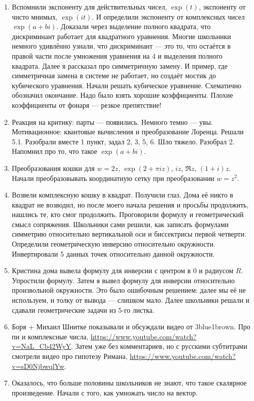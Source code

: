 \documentclass[12pt]{article}
\theoremstyle{definition}
\begin{document}
\begin{enumerate}
  \item Вспомнили экспоненту для действительных чисел, $\exp(t)$, экспоненту от чисто мнимых, $\exp(it)$. 
  И определили экспоненту от комплексных чисел $\exp(a + bi)$. Доказали через выделение полного квадрата, что дискриминант работает 
  для квадратного уравнения. Многие школьники немного удивлённо узнали, 
  что дискриминант — это то, что остаётся в правой части после умножения уравнения на 4 и выделения полного квадрата. 
  Далее я рассказал про симметричную замену. И пример, где симметричная замена в системе не работает, но создаёт мостик до кубического уравнения. 
  Начали решать кубическое уравнение. Схематично обозначил окончание. Надо было взять хорошие коэффициенты. Плохие коэффициенты от фонаря — резкое препятствие!
  \item   Реакция на критику: парты — появились. Немного темно — увы. Мотивационное: квантовые вычисления и преобразование Лоренца. 
  Решали 5.1. Разобрали вместе 1 пункт, задал 2, 3, 5, 6. Шло тяжело. Разобрал 2. Напомнил про то, что такое $\exp(a + bi)$.
  \item Преобразования кошки для $w=2z$, $\exp(2+\pi i z)$, $iz$, $\Re z$, $(1+i) z$. Начали преобразовывать координатную сетку при преобразовании $w=z^2$.
  \item Возвели комплексную кошку в квадрат. Получили глаз. Дома её никто в квадрат не возводил, но после моего начала решения и просьбы продолжить,
  нашлись те, кто смог продолжить. Проговорили формулу и геометрический смысл сопряжения. Школьники сами решили, как записать 
  формулами симметрию относительно вертикальной оси и биссектрисы первой четверти. 
  Определили геометрическую инверсию относительно окружности. Инвертировали 5 данных точек относительно данной окружности. 
  \item Кристина дома вывела формулу для инверсии с центром в 0 и радиусом $R$. Упростили формулу. Затем я вывел формулу для инверсии 
  относительно произвольной окружности. Это было ошибочным решением: далее мы её не используем, и толку от вывода — слишком мало. 
  Далее школьники решали и сдавали геометрические задачи из 5-го листка. 
  \item Боря + Михаил Шнитке показывали и обсуждали видео от 3blue1brown. Про пи и комплексные числа, \url{https://www.youtube.com/watch?v=NaL_Cb42WyY}. 
  Затем уже без комментариев, но с русскими субтитрами смотрели видео про гипотезу Римана, \url{https://www.youtube.com/watch?v=sD0NjbwqlYw}.
  \item Оказалось, что больше половины школьников не знают, что такое скалярное произведение. Начали с того, как умножать число на вектор. 

\end{enumerate}
\end{document}

